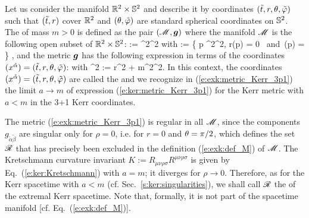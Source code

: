 Let us consider the manifold $\mathbb{R}^2\times\mathbb{S}^2$ and describe it by
coordinates $({\tilde t}, r, \theta,{\tilde\varphi})$ such that $({\tilde t},r)$ cover $\mathbb{R}^2$
and $(\theta,{\tilde\varphi})$ are standard spherical coordinates on $\mathbb{S}^2$.
The 
of mass $m>0$ is defined as the pair $(\mathscr{M}, \bm{g})$ where the manifold $\mathscr{M}$ is the following open subset of $\mathbb{R}^2\times\mathbb{S}^2$:
\be \label{e:exk:def_M}
 \M := \R^2\times\SS^2 \setminus \ring
\ee
with
\be \label{e:exk:def_ring}
    \ring := \left\{ p \in \R^2\times\SS^2,
        \quad r(p) = 0 \ \mbox{and}\ \th(p) =  \right\} ,
\ee
and the metric $\bm{g}$ has the following expression in terms of the coordinates
$(x^{\tilde{\alpha}}) = ({\tilde t}, r, \theta,{\tilde\varphi})$:
\be \label{e:exk:metric_Kerr_3p1}
\ee
with
\be
    \rho^2 := r^2 + m^2\cos^2\th .
\ee
In this context, the coordinates $(x^{\tilde{\alpha}}) = ({\tilde t}, r, \theta,{\tilde\varphi})$
are called the
and we recognize in (\ref{e:exk:metric_Kerr_3p1}) the limit $a\to m$ of
expression (\ref{e:ker:metric_Kerr_3p1}) for the Kerr metric with $a< m$
in the 3+1 Kerr coordinates.

The metric (\ref{e:exk:metric_Kerr_3p1}) is regular
in all $\mathscr{M}$, since the components $g_{\tilde{\alpha}\tilde{\beta}}$ are singular only
for $\rho=0$, i.e. for $r=0$ and $\theta=\pi/2$, which defines  the set $\mathscr{R}$ that has precisely been excluded in
the definition (\ref{e:exk:def_M}) of $\mathscr{M}$. The Kretschmann curvature
invariant $K := R_{\mu\nu\rho\sigma} R^{\mu\nu\rho\sigma}$
is given by Eq.~(\ref{e:ker:Kretschmann}) with $a=m$; it diverges for $\rho\to 0$. Therefore, as
for the Kerr spacetime with $a<m$ (cf. Sec.~\ref{s:ker:singularities}), we shall call $\mathscr{R}$ the 
of the extremal Kerr spacetime. Note that, formally, it is not part of the spacetime manifold
[cf. Eq.~(\ref{e:exk:def_M})].

